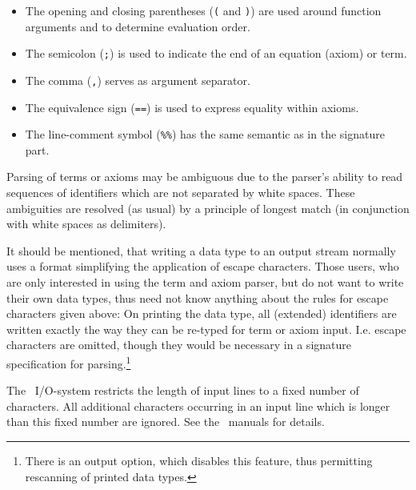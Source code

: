 \begin{itemize}
\item
The opening and closing parentheses ({\tt (} and {\tt )}) are used around function
arguments and to determine evaluation order.
\item
The semicolon ({\tt ;}) is used to indicate the end of an equation (axiom)
or term.
\item
The comma ({\tt ,}) serves as argument separator.
\item
The equivalence sign ({\tt ==}) is used to express equality within
axioms.
\item
The line-comment symbol ({\tt\verb|%%|}) has the same semantic as in the
signature part.
\end{itemize}

Parsing of terms or axioms may be ambiguous due to the parser's ability to read
sequences of identifiers which are not separated by white spaces.
These ambiguities are
resolved (as usual) by a principle of longest match (in conjunction with white
spaces as delimiters).

It should be mentioned, that writing a data type to an output stream normally
uses a format simplifying the application of escape characters. Those users, who 
are only
interested in using the term and axiom parser, but do not want to write their own 
data types, thus need not know anything about the rules for escape characters 
given above: On printing the data type, all (extended) identifiers
are written exactly the way they can be re-typed for term or axiom input. I.e. escape
characters are omitted, though they would be necessary in a signature specification
for parsing.\footnote{There is an output option, which disables this feature, thus
permitting rescanning of printed data types.}

\begin{note}
The \ALDES\ I/O-system restricts the length of input lines to a fixed 
number of characters.
All additional characters occurring in an input line which is longer 
than this fixed number are ignored. 
See the \ALDES\ manuals for details.
\end{note}
